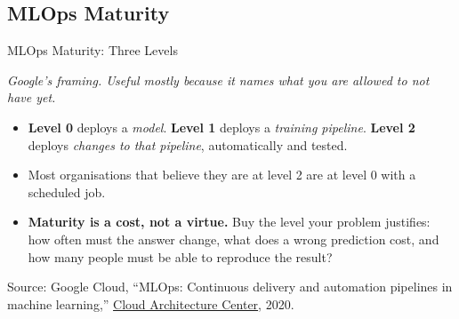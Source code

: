 \subsection{MLOps Maturity}

\begin{frame}{MLOps Maturity: Three Levels}

    \centering
    \textit{Google's framing. Useful mostly because it names what you are allowed to \emph{not} have yet.}
    \vspace{0.21em}


    \vspace{0.21em}
    \begin{itemize}
        \scriptsize
        \item \textbf{Level 0} deploys a \emph{model}. \textbf{Level 1} deploys a \emph{training pipeline}.
              \textbf{Level 2} deploys \emph{changes to that pipeline}, automatically and tested.
        \item Most organisations that believe they are at level 2 are at level 0 with a scheduled job.
        \item \textbf{Maturity is a cost, not a virtue.} Buy the level your problem justifies: how often must
              the answer change, what does a wrong prediction cost, and how many people must be able to
              reproduce the result?
    \end{itemize}

    \vspace{0.12em}
    {\scriptsize Source: Google Cloud, ``MLOps: Continuous delivery and automation pipelines in machine learning,''
    \href{https://cloud.google.com/architecture/mlops-continuous-delivery-and-automation-pipelines-in-machine-learning}{Cloud Architecture Center}, 2020.}

\end{frame}

